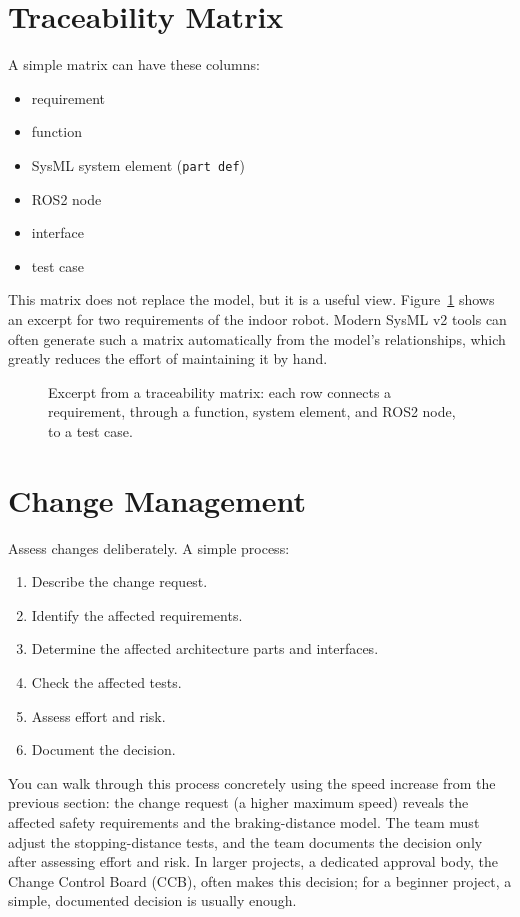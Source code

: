 \section{Traceability Matrix}
A simple matrix can have these columns:

\begin{itemize}
    \item requirement
    \item function
    \item SysML system element (\texttt{part def})
    \item ROS2 node
    \item interface
    \item test case
\end{itemize}

This matrix does not replace the model, but it is a useful view. Figure~\ref{fig:kap20-traceability-matrix} shows an excerpt for two requirements of the indoor robot. Modern SysML v2 tools can often generate such a matrix automatically from the model's relationships, which greatly reduces the effort of maintaining it by hand.

\begin{figure}[H]
  \centering
  \caption{Excerpt from a traceability matrix: each row connects a requirement, through a function, system element, and ROS2 node, to a test case.}
  \label{fig:kap20-traceability-matrix}
\end{figure}

\section{Change Management}
Assess changes deliberately. A simple process:

\begin{enumerate}
    \item Describe the change request.
    \item Identify the affected requirements.
    \item Determine the affected architecture parts and interfaces.
    \item Check the affected tests.
    \item Assess effort and risk.
    \item Document the decision.
\end{enumerate}

You can walk through this process concretely using the speed increase from the previous section: the change request (a higher maximum speed) reveals the affected safety requirements and the braking-distance model. The team must adjust the stopping-distance tests, and the team documents the decision only after assessing effort and risk. In larger projects, a dedicated approval body, the Change Control Board (CCB), often makes this decision; for a beginner project, a simple, documented decision is usually enough.

